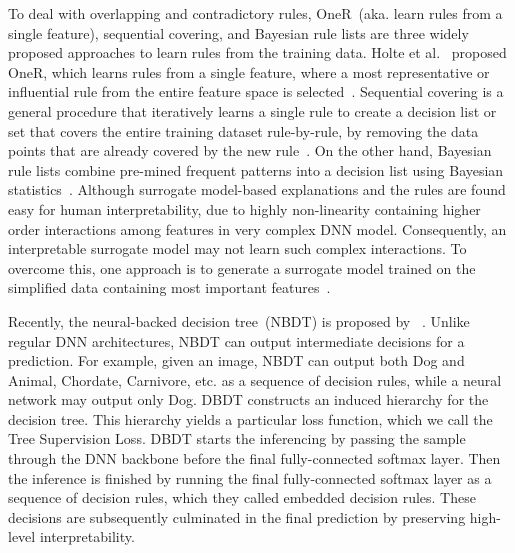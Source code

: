\hspace*{3.5mm} To deal with overlapping and contradictory rules, OneR~(aka. learn rules from a single feature), sequential covering, and Bayesian rule lists are three widely proposed approaches to learn rules from the training data. Holte et al.~\cite{holte1993very} proposed OneR, which learns rules from a single feature, where a most representative or influential rule from the entire feature space is selected~\cite{molnar2019interpretable}. Sequential covering is a general procedure that iteratively learns a single rule to create a decision list or set that covers the entire training dataset rule-by-rule, by removing the data points that are already covered by the new rule~\cite{molnar2019interpretable}. On the other hand, Bayesian rule lists combine pre-mined frequent patterns into a decision list using Bayesian statistics~\cite{molnar2019interpretable}.
Although surrogate model-based explanations and the rules are found easy for human interpretability, due to highly non-linearity containing higher order interactions among features in very complex DNN model. Consequently, an interpretable surrogate model may not learn such complex interactions. To overcome this, one approach is to generate a surrogate model trained on the simplified data containing most important features~\cite{molnar2019interpretable}.

\hspace*{3.5mm} Recently, the neural-backed decision tree~(NBDT) is proposed by ~\cite{wan2020nbdt}. Unlike regular DNN architectures, NBDT can output intermediate decisions for a prediction. For example, given an image, NBDT can output both Dog and Animal, Chordate, Carnivore, etc. as a sequence of decision rules, while a neural network may output only Dog. DBDT constructs an induced hierarchy for the decision tree. This hierarchy yields a particular loss function, which we call the Tree Supervision Loss. DBDT starts the inferencing by passing the sample through the DNN backbone before the final fully-connected softmax layer. Then the inference is finished by running the final fully-connected softmax layer as a sequence of decision rules, which they called embedded decision rules. These decisions are subsequently culminated in the final prediction by preserving high-level interpretability. 

